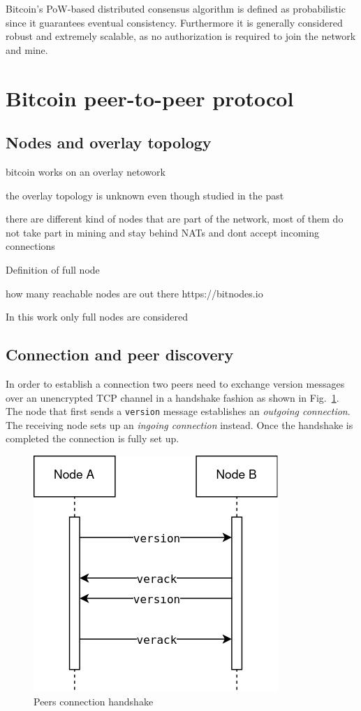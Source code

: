 \documentclass[12pt, letterpaper, twoside]{article}
\begin{document}
Bitcoin's PoW-based distributed consensus algorithm is defined as probabilistic since it guarantees eventual consistency. Furthermore it is generally considered robust and extremely scalable, as no authorization is required to join the network and mine.


\section{Bitcoin peer-to-peer protocol}\label{sec:netintro}

\subsection{Nodes and overlay topology}\label{sec:overlay}

bitcoin works on an overlay netowork

the overlay topology is unknown even though studied in the past

there are different kind of nodes that are part of the network, most of them do not take part in mining and stay behind NATs and dont accept incoming connections

Definition of full node

how many reachable nodes are out there https://bitnodes.io

In this work only full nodes are considered


\subsection{Connection and peer discovery}\label{sec:peerdisc}
In order to establish a connection two peers need to exchange version messages over an unencrypted TCP channel in a handshake fashion as shown in Fig.~\ref{fig:btcconn}. The node that first sends a \texttt{version} message establishes an \emph{outgoing connection}. The receiving node sets up an \emph{ingoing connection} instead. Once the handshake is completed the connection is fully set up.

\begin{figure}[h]
	\includegraphics[width=.45\textwidth]{pict/BTCconnection.png}
	\centering
	\caption{Peers connection handshake}
	\label{fig:btcconn}
\end{figure}
\end{document}
